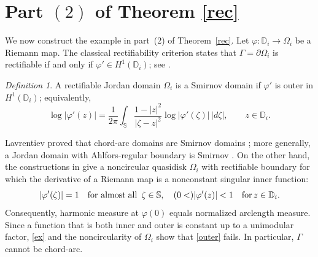 \documentclass[11pt]{article}
\numberwithin{equation}{section}
\theoremstyle{remark}
\newtheorem*{definition}{Definition}
\begin{document}
\section{Part \texorpdfstring{$(2)$}{(2)} of Theorem \ref{rec}}\label{sec:ex}
We now construct the example in part~\rm(2) of Theorem~\ref{rec}.
Let $\varphi:\mathbb D_i\to\Omega_i$ be a Riemann map.  The classical
rectifiability criterion states that $\Gamma=\partial\Omega_i$ is rectifiable
if and only if $\varphi'\in H^1(\mathbb D_i)$; see \cite[Chapter~3]{pom}.
\begin{definition} 
A rectifiable Jordan domain $\Omega_i$ is a Smirnov domain if
$\varphi'$ is outer in $H^1(\mathbb D_i)$; equivalently,
\begin{equation}\label{outer}
    \log|\varphi'(z)|
    =\frac{1}{2\pi}\int_{\mathbb S}
    \frac{1-|z|^2}{|\zeta-z|^2}\log|\varphi'(\zeta)|\,|d\zeta|,
    \qquad z\in\mathbb D_i.
\end{equation}
\end{definition}
Lavrentiev proved that chord-arc domains are Smirnov domains
\cite{lav}; more generally, a Jordan domain with Ahlfors-regular boundary is
Smirnov \cite{zinRegular}.  On the other hand, the constructions in \cite{dss,kah}
give a noncircular quasidisk $\Omega_i$ with rectifiable boundary for which
the derivative of a Riemann map is a nonconstant singular inner function:
\begin{equation}\label{ex}
    \vert\varphi'(\zeta)\vert = 1 \quad \text{\rm for almost\;all }\, \zeta \in \mathbb S, \quad (0 <) \vert\varphi'(z)\vert < 1 \quad \text{\rm for}\, z \in \mathbb D_i. 
\end{equation}
Consequently, harmonic measure at $\varphi(0)$ equals normalized
arclength measure.  Since a function that is both inner and outer is constant
up to a unimodular factor, \eqref{ex} and the noncircularity of $\Omega_i$
show that \eqref{outer} fails.  In particular, $\Gamma$ cannot be chord-arc.
\end{document}

